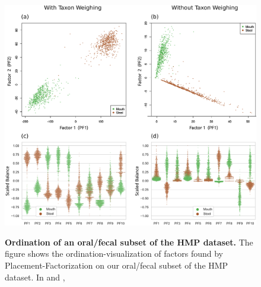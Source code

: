 \begin{figure}[!htbp]
    \centering
     \includegraphics[width=\linewidth]{pdf/hmp_pf_of_600_factor_ordination.pdf}
    \begin{subfigure}{0pt}
        \label{fig:hmp_pf_of_600_factor_ordination:sub:2d_with_taxon_weighting}
    \end{subfigure}
    \begin{subfigure}{0pt}
        \label{fig:hmp_pf_of_600_factor_ordination:sub:2d_without_taxon_weighting}
    \end{subfigure}
    \begin{subfigure}{0pt}
        \label{fig:hmp_pf_of_600_factor_ordination:sub:10d_with_taxon_weighting}
    \end{subfigure}
    \begin{subfigure}{0pt}
        \label{fig:hmp_pf_of_600_factor_ordination:sub:10d_without_taxon_weighting}
    \end{subfigure}
    \caption[Ordination of an oral/fecal subset of the \acs{HMP} dataset]{
        \textbf{Ordination of an oral/fecal subset of the \ac{HMP} dataset.}
        The figure shows the ordination-visualization of factors found by Placement-Factorization
        on our oral/fecal subset of the \ac{HMP} dataset.
        In 
        and ,
}
\end{figure}
